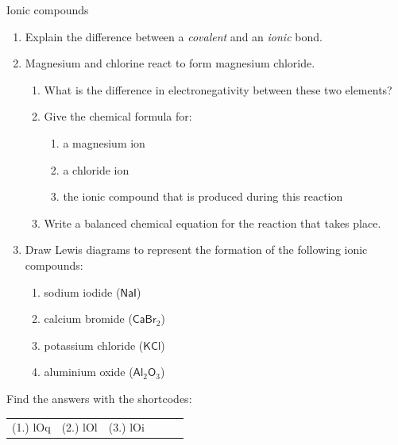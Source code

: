             \begin{exercises}{Ionic compounds
        }
            \nopagebreak
        \label{m38684*id142562}\begin{enumerate}[noitemsep, label=\textbf{\arabic*}. ] 
            \label{m38684*uid57}\item Explain the difference between a \textsl{covalent} and an \textsl{ionic} bond.\newline
\label{m38684*uid58}\item Magnesium and chlorine react to form magnesium chloride.
\label{m38684*id142602}\begin{enumerate}[noitemsep, label=\textbf{\alph*}. ] 
            \label{m38684*uid59}\item What is the difference in electronegativity between these two elements?
\label{m38684*uid60}\item Give the chemical formula for:
\label{m38684*id142630}\begin{enumerate}[noitemsep, label=\textbf{\roman*}. ] 
            \label{m38684*uid61}\item a magnesium ion
\label{m38684*uid62}\item a chloride ion
\label{m38684*uid63}\item the ionic compound that is produced during this reaction
\end{enumerate}
        \label{m38684*uid64}\item Write a balanced chemical equation for the reaction that takes place.
\end{enumerate}
        \label{m38684*uid65}\item Draw Lewis diagrams to represent the formation of the following ionic compounds:
\label{m38684*id142697}\begin{enumerate}[noitemsep, label=\textbf{\alph*}. ] 
            \label{m38684*uid66}\item sodium iodide ($\mathsf{NaI}$)
\label{m38684*uid67}\item calcium bromide ($\mathsf{CaBr}{}_{2}$)
\label{m38684*uid68}\item potassium chloride ($\mathsf{KCl}$)
\item aluminium oxide ($\mathsf{Al}_{2}\mathsf{O}_{3}$)
\end{enumerate}
        \end{enumerate}
      \label{m38684*uid69}
\par {} Find the answers with the shortcodes:
 \par \begin{tabular}[h]{cccccc}
 (1.) lOq  &  (2.) lOl  &  (3.) lOi  & \end{tabular}
\end{exercises}

